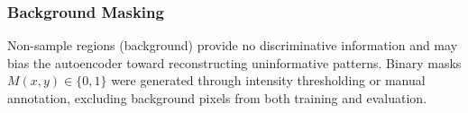 






\subsubsection{Background Masking}
Non-sample regions (background) provide no discriminative information and may bias the autoencoder toward reconstructing uninformative patterns.
Binary masks $M(x, y) \in \{0, 1\}$ were generated through intensity thresholding or manual annotation, excluding background pixels from both training and evaluation.

